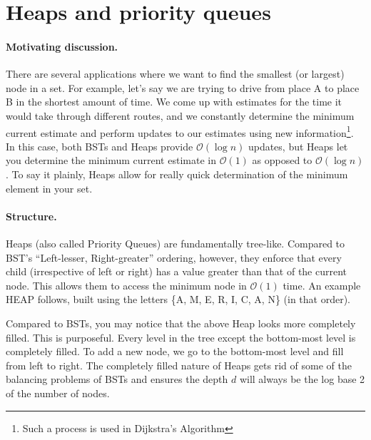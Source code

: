 \documentclass{pset_template}
\begin{document}
\section{Heaps and priority queues}
\paragraph{Motivating discussion.}
There are several applications where we want to find the smallest (or largest) node in a set.
For example, let's say we are trying to drive from place A to place B
in the shortest amount of time.
We come up with estimates for the time it would take through different routes,
and we constantly determine the minimum current
estimate and perform updates to our estimates using new
information\footnote{Such a process is used in Dijkstra's Algorithm}.
In this case, both BSTs and Heaps
provide $\mathcal{O}(\log{}n)$ updates,
but Heaps let you determine the minimum current estimate in $\mathcal{O}(1)$
as opposed to $\mathcal{O}(\log{}n)$.
To say it plainly, Heaps allow for really quick determination of the
minimum element in your set.

\paragraph{Structure.}
Heaps (also called Priority Queues) are fundamentally tree-like.
Compared to BST's ``Left-lesser, Right-greater'' ordering, however, they
enforce that every child (irrespective of left or right)
has a value greater than that of the current node.
This allows them to access the minimum node in $\mathcal{O}(1)$ time.
An example HEAP follows, built using the letters \{A, M, E, R, I, C, A, N\}
(in that order).
\begin{center}
\end{center}

Compared to BSTs, you may notice that the above Heap looks more completely filled.
This is purposeful.
Every level in the tree except the bottom-most level is completely filled.
To add a new node, we go to the bottom-most level and fill from left to right.
The completely filled nature of Heaps gets rid of some of the
balancing problems of BSTs and ensures the depth $d$
will always be the log base 2 of the number of nodes.
\end{document}
